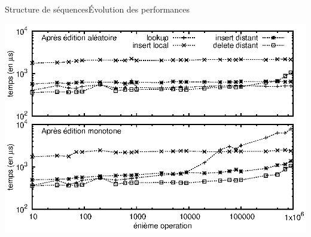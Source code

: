 \begin{frame}{Structure de séquences}{Évolution des performances}

  \begin{center}
    \includegraphics[width=\textwidth]{img/replication/time.eps}
  \end{center}

\end{frame}

